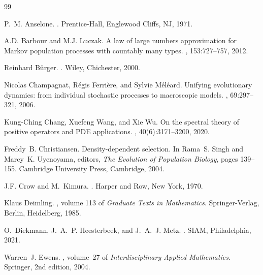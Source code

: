 \documentclass[12pt]{article}
\begin{document}
%
%

\begin{thebibliography}{99}

P.~M. Anselone.
.
\newblock Prentice-Hall, Englewood Cliffs, NJ, 1971.

A.D. Barbour and M.J. Luczak.
\newblock A law of large numbers approximation for {M}arkov population
  processes with countably many types.
, 153:727--757, 2012.

Reinhard B{\"u}rger.
.
\newblock Wiley, Chichester, 2000.

Nicolas Champagnat, R\'egis Ferri\`ere, and Sylvie M\'el\'eard.
\newblock Unifying evolutionary dynamics: from individual stochastic processes
  to macroscopic models.
, 69:297--321, 2006.

Kung-Ching Chang, Xuefeng Wang, and Xie Wu.
\newblock On the spectral theory of positive operators and {PDE} applications.
, 40(6):3171--3200, 2020.

Freddy~B. Christiansen.
\newblock Density-dependent selection.
\newblock In Rama~S. Singh and Marcy~K. Uyenoyama, editors, {\em The Evolution
  of Population Biology}, pages 139--155. Cambridge University Press,
  Cambridge, 2004.

J.F. Crow and M.~Kimura.
.
\newblock Harper and Row, New York, 1970.

Klaus Deimling.
, volume 113 of {\em Graduate
  Texts in Mathematics}.
\newblock Springer-Verlag, Berlin, Heidelberg, 1985.

O.~Diekmann, J.~A.~P. Heesterbeek, and J.~A.~J. Metz.
.
\newblock SIAM, Philadelphia, 2021.

Warren~J. Ewens.
,
  volume~27 of {\em Interdisciplinary Applied Mathematics}.
\newblock Springer, 2nd edition, 2004.


\end{thebibliography}
\end{document}
